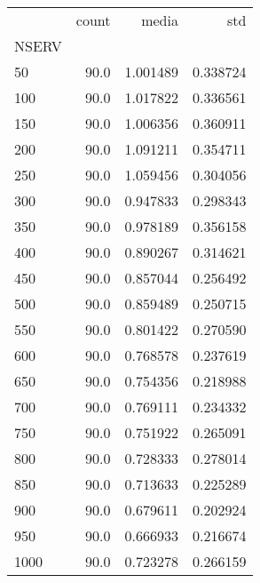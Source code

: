 \begin{tabular}{lrrr}
\toprule
{} &  count &     media &       std \\
NSERV &        &           &           \\
\midrule
50    &   90.0 &  1.001489 &  0.338724 \\
100   &   90.0 &  1.017822 &  0.336561 \\
150   &   90.0 &  1.006356 &  0.360911 \\
200   &   90.0 &  1.091211 &  0.354711 \\
250   &   90.0 &  1.059456 &  0.304056 \\
300   &   90.0 &  0.947833 &  0.298343 \\
350   &   90.0 &  0.978189 &  0.356158 \\
400   &   90.0 &  0.890267 &  0.314621 \\
450   &   90.0 &  0.857044 &  0.256492 \\
500   &   90.0 &  0.859489 &  0.250715 \\
550   &   90.0 &  0.801422 &  0.270590 \\
600   &   90.0 &  0.768578 &  0.237619 \\
650   &   90.0 &  0.754356 &  0.218988 \\
700   &   90.0 &  0.769111 &  0.234332 \\
750   &   90.0 &  0.751922 &  0.265091 \\
800   &   90.0 &  0.728333 &  0.278014 \\
850   &   90.0 &  0.713633 &  0.225289 \\
900   &   90.0 &  0.679611 &  0.202924 \\
950   &   90.0 &  0.666933 &  0.216674 \\
1000  &   90.0 &  0.723278 &  0.266159 \\
\bottomrule
\end{tabular}
